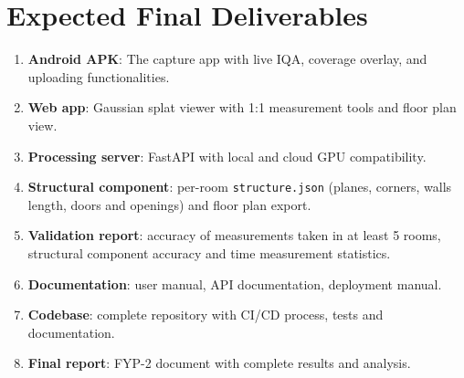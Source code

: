 \section{Expected Final Deliverables}
\begin{enumerate}
    \item \textbf{Android APK}: The capture app with live IQA, coverage overlay, and uploading functionalities.
    \item \textbf{Web app}: Gaussian splat viewer with 1:1 measurement tools and floor plan view.
    \item \textbf{Processing server}: FastAPI with local and cloud GPU compatibility.
    \item \textbf{Structural component}: per-room \texttt{structure.json} (planes, corners, walls length, doors and openings) and floor plan export.
    \item \textbf{Validation report}: accuracy of measurements taken in at least 5 rooms, structural component accuracy and time measurement statistics.
    \item \textbf{Documentation}: user manual, API documentation, deployment manual.
    \item \textbf{Codebase}: complete repository with CI/CD process, tests and documentation.
    \item \textbf{Final report}: FYP-2 document with complete results and analysis.
\end{enumerate}

